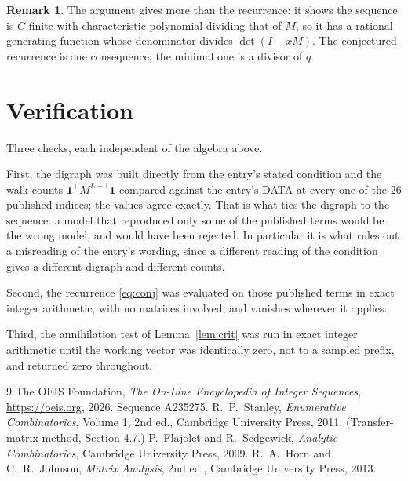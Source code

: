 \documentclass[11pt,a4paper]{article}
\theoremstyle{plain}
\theoremstyle{definition}
\newtheorem{remark}[theorem]{Remark}
\begin{document}
\begin{remark}
The argument gives more than the recurrence: it shows the sequence is $C$-finite with
characteristic polynomial dividing that of $M$, so it has a rational generating function
whose denominator divides $\det(I-xM)$. The conjectured recurrence is one consequence; the
minimal one is a divisor of $q$.
\end{remark}

\section{Verification}

Three checks, each independent of the algebra above.

First, the digraph was built directly from the entry's stated condition and the walk counts
$\mathbf{1}^{\!\top}M^{L-1}\mathbf{1}$ compared against the entry's DATA at
every one of the $26$ published indices; the values agree exactly. That is what ties
the digraph to the sequence: a model that reproduced only some of the published terms would
be the wrong model, and would have been rejected. In particular it is what rules out a
misreading of the entry's wording, since a different reading of the condition gives a
different digraph and different counts.

Second, the recurrence \eqref{eq:conj} was evaluated on those published terms in exact
integer arithmetic, with no matrices involved, and vanishes wherever it applies.

Third, the annihilation test of Lemma~\ref{lem:crit} was run in exact integer arithmetic
until the working vector was identically zero, not to a sampled prefix, and returned zero
throughout.

\begin{thebibliography}{9}
 The OEIS Foundation, \emph{The On-Line Encyclopedia of Integer
Sequences}, \url{https://oeis.org}, 2026. Sequence A235275.
 R.~P.~Stanley, \emph{Enumerative Combinatorics}, Volume 1, 2nd ed.,
Cambridge University Press, 2011. (Transfer-matrix method, Section 4.7.)
 P.~Flajolet and R.~Sedgewick, \emph{Analytic Combinatorics}, Cambridge
University Press, 2009.
 R.~A.~Horn and C.~R.~Johnson, \emph{Matrix Analysis}, 2nd ed., Cambridge
University Press, 2013.
\end{thebibliography}
\end{document}
